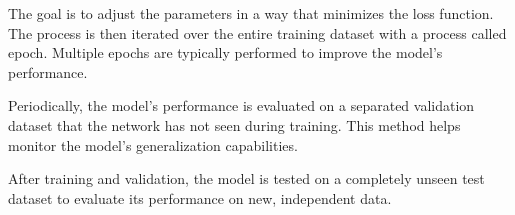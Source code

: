 The goal is to adjust the parameters in a way that minimizes the loss function. The process is then iterated over the entire training dataset with a process called epoch. Multiple epochs are typically performed to improve the model's performance.

Periodically, the model's performance is evaluated on a separated validation dataset that the network has not seen during training. This method helps monitor the model's generalization capabilities.

After training and validation, the model is tested on a completely unseen test dataset to evaluate its performance on new, independent data.
